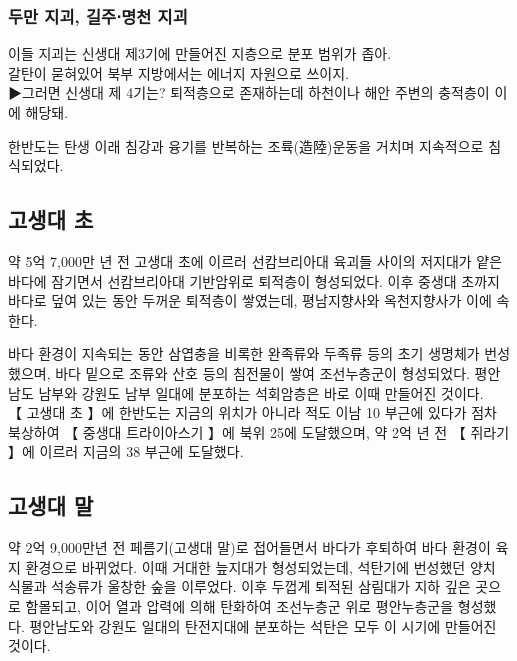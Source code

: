 \documentclass[12pt,a4paper]{book}
\begin{document}
			\subsubsection{두만 지괴, 길주⋅명천 지괴}
				이들 지괴는 신생대 제3기에 만들어진 지층으로  분포 범위가 좁아. \\
				갈탄이 묻혀있어 북부 지방에서는 에너지 자원으로 쓰이지.\\
				
				▶그러면 신생대 제 4기는?
				퇴적층으로 존재하는데
				하천이나 해안 주변의 충적층이 이에 해당돼.\\
				


		\newpage
			

		\newpage
			




한반도는 탄생 이래 침강과 융기를 반복하는 조륙(造陸)운동을 거치며 지속적으로 침식되었다. \\

		\subsection{고생대 초}
				약 5억 7,000만 년 전 고생대 초에 이르러 
				선캄브리아대 육괴들 사이의 저지대가 얕은 바다에 잠기면서 
				선캄브리아대 기반암위로 퇴적층이 형성되었다. 
				이후 중생대 초까지 바다로 덮여 있는 동안 두꺼운 퇴적층이 쌓였는데, 
				평남지향사와 옥천지향사가 이에 속한다.
				
				바다 환경이 지속되는 동안 삼엽충을 비록한 완족류와 두족류 등의 초기 생명체가 번성했으며, 
				바다 밑으로 조류와 산호 등의 침전물이 쌓여 조선누층군이 형성되었다. 
				평안남도 남부와 강원도 남부 일대에 분포하는 석회암층은 바로 이때 만들어진 것이다. \\

【 고생대 초 】에 한반도는 지금의 위치가 아니라 적도 이남 10 부근에 있다가 점차 북상하여 【 중생대 트라이아스기 】에 북위 25에 도달했으며, 약 2억 년 전 【 쥐라기 】에 이르러 지금의 38 부근에 도달했다.\\


		\subsection{고생대 말}
				약 2억 9,000만년 전 페름기(고생대 말)로 접어들면서 
				바다가 후퇴하여 바다 환경이 육지 환경으로 바뀌었다. 
				이때 거대한 늪지대가 형성되었는데, 
				석탄기에 번성했던 양치 식물과 석송류가 울창한 숲을 이루었다. 
				이후 두껍게 퇴적된 삼림대가 지하 깊은 곳으로 함몰되고, 
				이어 열과 압력에 의해 탄화하여 조선누층군 위로 평안누층군을 형성했다. 
				평안남도와 강원도 일대의 탄전지대에 분포하는 석탄은 모두 이 시기에 만들어진 것이다.\\
\end{document}
